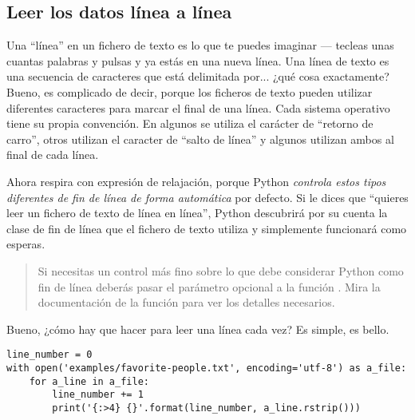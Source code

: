 \subsection{Leer los datos línea a línea}

Una ``línea'' en un fichero de texto es lo que te puedes imaginar --- tecleas unas cuantas palabras y pulsas  y ya estás en una nueva línea. Una línea de texto es una secuencia de caracteres que está delimitada por... ¿qué cosa exactamente? Bueno, es complicado de decir, porque los ficheros de texto pueden utilizar diferentes caracteres para marcar el final de una línea. Cada sistema operativo tiene su propia convención. En algunos se utiliza el carácter de ``retorno de carro'', otros utilizan el caracter de ``salto de línea'' y algunos utilizan ambos al final de cada línea.

Ahora respira con expresión de relajación, porque Python \emph{controla estos tipos diferentes de fin de línea  de forma automática} por defecto. Si le dices que ``quieres leer un fichero de texto de línea en línea'', Python descubrirá por su cuenta la clase de fin de línea que el fichero de texto utiliza y simplemente funcionará como esperas.

\begin{quote}
Si necesitas un control más fino sobre lo que debe considerar Python como fin de línea deberás pasar el parámetro opcional  a la función . Mira la documentación de la función \href{http://docs.python.org/3.1/library/io.html#module-interface}{} para ver los detalles necesarios.
\end{quote}

Bueno, ¿cómo hay que hacer para leer una línea cada vez? Es simple, es bello.

\noindent\begin{minipage}{\textwidth}
\begin{lstlisting}[mathescape=True]
line_number = 0
with open('examples/favorite-people.txt', encoding='utf-8') as a_file:
    for a_line in a_file:
        line_number += 1
        print('{:>4} {}'.format(line_number, a_line.rstrip()))
\end{lstlisting}
\end{minipage}

